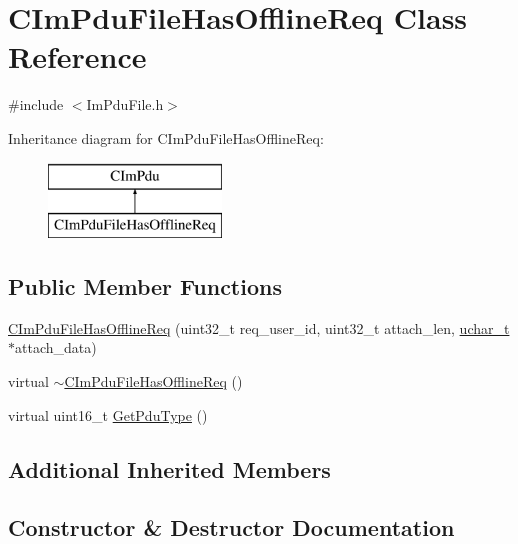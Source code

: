 \hypertarget{class_c_im_pdu_file_has_offline_req}{}\section{C\+Im\+Pdu\+File\+Has\+Offline\+Req Class Reference}
\label{class_c_im_pdu_file_has_offline_req}


{\ttfamily \#include $<$Im\+Pdu\+File.\+h$>$}

Inheritance diagram for C\+Im\+Pdu\+File\+Has\+Offline\+Req\+:\begin{figure}[H]
\begin{center}
\leavevmode
\includegraphics[height=2.000000cm]{class_c_im_pdu_file_has_offline_req}
\end{center}
\end{figure}
\subsection*{Public Member Functions}
\begin{DoxyCompactItemize}
\item 
\hyperlink{class_c_im_pdu_file_has_offline_req_af267b2d898fe21ce36099abd9741f1fb}{C\+Im\+Pdu\+File\+Has\+Offline\+Req} (uint32\+\_\+t req\+\_\+user\+\_\+id, uint32\+\_\+t attach\+\_\+len, \hyperlink{base_2ostype_8h_a124ea0f8f4a23a0a286b5582137f0b8d}{uchar\+\_\+t} $\ast$attach\+\_\+data)
\item 
virtual \hyperlink{class_c_im_pdu_file_has_offline_req_a2f58c32873a1aaea6988610df770975e}{$\sim$\+C\+Im\+Pdu\+File\+Has\+Offline\+Req} ()
\item 
virtual uint16\+\_\+t \hyperlink{class_c_im_pdu_file_has_offline_req_a3edc1581110e5275c05f38511830bce8}{Get\+Pdu\+Type} ()
\end{DoxyCompactItemize}
\subsection*{Additional Inherited Members}


\subsection{Constructor \& Destructor Documentation}
\hypertarget{class_c_im_pdu_file_has_offline_req_af267b2d898fe21ce36099abd9741f1fb}{}
